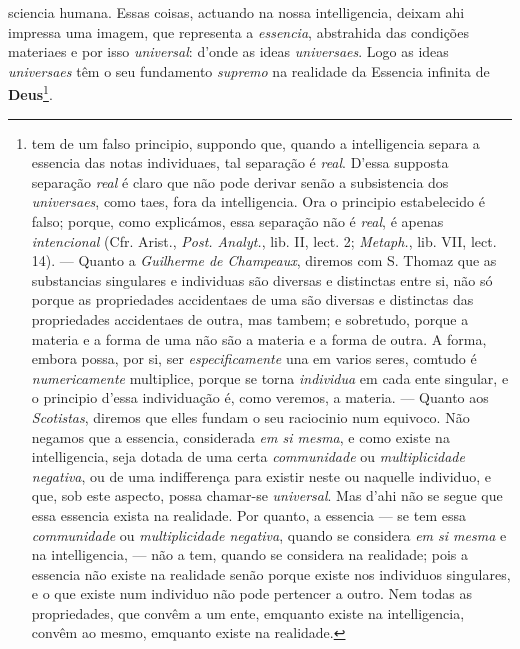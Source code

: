   sciencia humana. Essas coisas, actuando na nossa intelligencia, deixam ahi impressa uma imagem, que representa a \emph{essencia}, abstrahida das condições materiaes e por isso \emph{universal}: d'onde as ideas \emph{universaes}. Logo as ideas \emph{universaes} têm o seu fundamento \emph{supremo} na realidade da Essencia infinita de \textbf{Deus}\footnote{tem de um falso principio, suppondo que, quando a intelligencia separa a essencia das notas individuaes, tal separação é \emph{real}. D'essa supposta separação \emph{real} é claro que não pode derivar senão a subsistencia dos \emph{universaes}, como taes, fora da intelligencia. Ora o principio estabelecido é falso; porque, como explicámos, essa separação não é \emph{real}, é apenas \emph{intencional} (Cfr. Arist., \emph{Post. Analyt.}, lib. II, lect. 2; \emph{Metaph.}, lib. VII, lect. 14). --- Quanto a \emph{Guilherme de Champeaux}, diremos com S. Thomaz que as substancias singulares e individuas são diversas e distinctas entre si, não só porque as propriedades accidentaes de uma são diversas e distinctas das propriedades accidentaes de outra, mas tambem; e sobretudo, porque a materia e a forma de uma não são a materia e a forma de outra. A forma, embora possa, por si, ser \emph{especificamente} una em varios seres, comtudo é \emph{numericamente} multiplice, porque se torna \emph{individua} em cada ente singular, e o principio d'essa individuação é, como veremos, a materia. --- Quanto aos \emph{Scotistas}, diremos que elles fundam o seu raciocinio num equivoco. Não negamos que a essencia, considerada \emph{em si mesma}, e como existe na intelligencia, seja dotada de uma certa \emph{communidade} ou \emph{multiplicidade negativa}, ou de uma indifferença para existir neste ou naquelle individuo, e que, sob este aspecto, possa chamar-se \emph{universal}. Mas d'ahi não se segue que essa essencia exista na realidade. Por quanto, a essencia --- se tem essa \emph{communidade} ou \emph{multiplicidade negativa}, quando se considera \emph{em si mesma} e na intelligencia, --- não a tem, quando se considera na realidade; pois a essencia não existe na realidade senão porque existe nos individuos singulares, e o que existe num individuo não pode pertencer a outro. Nem todas as propriedades, que convêm a um ente, emquanto existe na intelligencia, convêm ao mesmo, emquanto existe na realidade.}.

